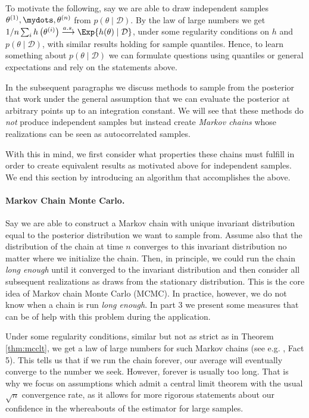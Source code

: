 To motivate the following, say we are able to draw independent samples $\theta^{(1)}, \mydots, \theta^{(n)}$ from $p(\theta \mid \mathcal{D})$.
By the law of large numbers we get $1 / n \sum_i h\left(\theta^{(i)}\right) \overset{a.s.}{\longrightarrow} \Exp{h(\theta) \mid \mathcal{D}}$, under some regularity conditions on $h$ and $p(\theta \mid \mathcal{D})$, with similar results holding for sample quantiles.
Hence, to learn something about $p(\theta \mid \mathcal{D})$ we can formulate questions using quantiles or general expectations and rely on the statements above.

In the subsequent paragraphs we discuss methods to sample from the posterior that work under the general assumption that we can evaluate the posterior at arbitrary points up to an integration constant.
We will see that these methods do \emph{not} produce independent samples but instead create \emph{Markov chains} whose realizations can be seen as autocorrelated samples.

With this in mind, we first consider what properties these chains must fulfill in order to create equivalent results as motivated above for independent samples.
We end this section by introducing an algorithm that accomplishes the above.

\paragraph{Markov Chain Monte Carlo.}
Say we are able to construct a Markov chain with unique invariant distribution equal to the posterior distribution we want to sample from.
Assume also that the distribution of the chain at time $n$ converges to this invariant distribution no matter where we initialize the chain.
Then, in principle, we could run the chain \emph{long enough} until it converged to the invariant distribution and then consider all subsequent realizations as draws from the stationary distribution.
This is the core idea of Markov chain Monte Carlo (MCMC).
In practice, however, we do not know when a chain is run \emph{long enough}.
In part 3 we present some measures that can be of help with this problem during the application.

Under some regularity conditions, similar but not as strict as in Theorem \ref{thm:mcclt}, we get a law of large numbers for such Markov chains (see e.g. \citet{roberts2004}, Fact 5).
This tells us that if we run the chain forever, our average will eventually converge to the number we seek.
However, forever is usually too long.
That is why we focus on assumptions which admit a central limit theorem with the usual $\sqrt{n}$ convergence rate, as it allows for more rigorous statements about our confidence in the whereabouts of the estimator for large samples.

